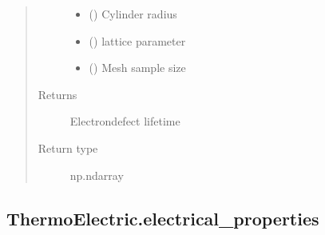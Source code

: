 \documentclass[letterpaper,10pt,english]{sphinxmanual}
\begin{document}
\begin{fulllineitems}
\begin{quote}
\begin{description}
\begin{itemize}
\item {} 
\sphinxAtStartPar
{} () \textendash{} Cylinder radius

\item {} 
\sphinxAtStartPar
{} () \textendash{} lattice parameter

\item {} 
\sphinxAtStartPar
{} () \textendash{} Mesh sample size

\end{itemize}

\item[{Returns}] \leavevmode
\sphinxAtStartPar
{} \textendash{} Electron\sphinxhyphen{}defect lifetime

\item[{Return type}] \leavevmode
\sphinxAtStartPar
np.ndarray

\end{description}\end{quote}

\end{fulllineitems}



\subsection{ThermoElectric.electrical\_properties}
\label{\detokenize{autosummary/ThermoElectric.electrical_properties:thermoelectric-electrical-properties}}\label{\detokenize{autosummary/ThermoElectric.electrical_properties::doc}}
\end{document}
